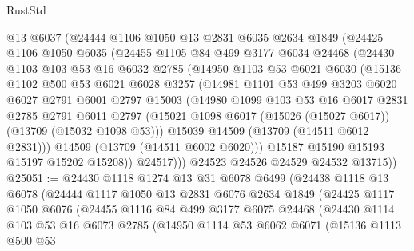 \begin{lexlean}{RustStd}
\begin{coremodule}
      @13
      @6037
      (@24444
        @1106
        @1050
        @13
        @2831
        @6035
        @2634
        @1849
        (@24425
          @1106
          @1050
          @6035
          (@24455
            @1105
            @84
            @499
            @3177
            @6034
            @24468
            (@24430
              @1103
              @103
              @53
              @16
              @6032
              @2785
              (@14950
                @1103
                @53
                @6021
                @6030
                (@15136
                  @1102
                  @500
                  @53
                  @6021
                  @6028
                  @3257
                  (@14981
                    @1101
                    @53
                    @499
                    @3203
                    @6020
                    @6027
                    @2791
                    @6001
                    @2797
                    @15003
                    (@14980
                      @1099
                      @103
                      @53
                      @16
                      @6017
                      @2831
                      @2785
                      @2791
                      @6011
                      @2797
                      (@15021 @1098 @6017 (@15026 (@15027 @6017)) (@13709 (@15032 @1098 @53)))
                      @15039
                      @14509
                      (@13709 (@14511 @6012 @2831)))
                    @14509
                    (@13709 (@14511 @6002 @6020)))
                  @15187
                  @15190
                  @15193
                  @15197
                  @15202
                  @15208))
              @24517)))
        @24523
        @24526
        @24529
        @24532
        @13715))
@25051 := @24430
    @1118
    @1274
    @13
    @31
    @6078
    @6499
    (@24438
      @1118
      @13
      @6078
      (@24444
        @1117
        @1050
        @13
        @2831
        @6076
        @2634
        @1849
        (@24425
          @1117
          @1050
          @6076
          (@24455
            @1116
            @84
            @499
            @3177
            @6075
            @24468
            (@24430
              @1114
              @103
              @53
              @16
              @6073
              @2785
              (@14950
                @1114
                @53
                @6062
                @6071
                (@15136
                  @1113
                  @500
                  @53

\end{coremodule}
\end{lexlean}
